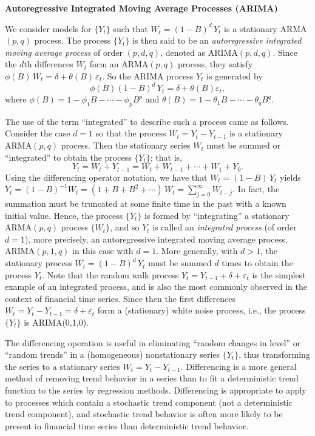 \noindent\textbf{Autoregressive Integrated Moving Average Processes (ARIMA)} \twomedskip


We consider models for $\{ Y_t \}$ such that $W_t = (1 - B)^d\, Y_t$ is a stationary ARMA$(p,q)$ process. The process $\{ Y_t \}$ is then said to be an \emph{autoregressive integrated moving average process} of order $(p,d,q)$, denoted as ARIMA$(p,d,q)$. Since the $d$th differences $W_t$ form an ARMA$(p,q)$ process, they satisfy $\phi(B)\, W_t = \delta + \theta(B)\, \varepsilon_t$. So the ARIMA process $Y_t$ is generated by 
	\begin{equation} \label{eqn:phiBdy}
	\phi(B)(1 - B)^d\, Y_t = \delta + \theta(B)\varepsilon_t,
	\end{equation}
where $\phi(B) = 1 - \phi_1 B - \cdots - \phi_p B^p$ and $\theta(B) = 1 - \theta_1 B - \cdots - \theta_q B^q$.


The use of the term ``integrated'' to describe such a process came as follows. Consider the case $d=1$ so that the process $W_t = Y_t - Y_{t-1}$ is a stationary ARMA$(p,q)$ process. Then the stationary series $W_t$ must be summed or ``integrated'' to obtain the process $\{Y_t\}$; that is,
	\[
	Y_t = W_t + Y_{t-1} = W_t + W_{t-1} + \cdots + W_1 + Y_0.
	\]
Using the differencing operator notation, we have that $W_t = (1 - B)\, Y_t$ yields $Y_t = (1 - B)^{-1}W_t = (1 + B + B^2 + \cdots)\, W_t = \sum_{j=0}^\infty W_{t-j}$. In fact, the summation must be truncated at some finite time in the past with a known initial value. Hence, the process $\{ Y_t \}$ is formed by ``integrating'' a stationary ARMA$(p,q)$ process $\{ W_t \}$, and so $Y_t$ is called an \emph{integrated process} (of order $d=1$), more precisely, an autoregressive integrated moving average process, ARIMA$(p,1,q)$ in this case with $d= 1$. More generally, with $d > 1$, the stationary process $W_t = (1 - B)^d\, Y_t$ must be summed $d$ times to obtain the process $Y_t$. Note that the random walk process $Y_t = Y_{t-1} + \delta + \varepsilon_t$ is the simplest example of an integrated process, and is also the most commonly observed in the context of financial time series. Since then the first differences $W_t = Y_t - Y_{t-1} = \delta + \varepsilon_t$ form a (stationary) white noise process, i.e., the process $\{ Y_t \}$ is ARIMA(0,1,0).


The differencing operation is useful in eliminating ``random changes in level'' or ``random trends'' in a (homogeneous) nonstationary series $\{ Y_t \}$, thus transforming the series to a stationary series $W_t = Y_t - Y_{t-1}$. Differencing is a more general method of removing trend behavior in a series than to fit a deterministic trend function to the series by regression methods. Differencing is appropriate to apply to processes which contain a stochastic trend component (not a deterministic trend component), and stochastic trend behavior is often more likely to be present in financial time series than deterministic trend behavior.


